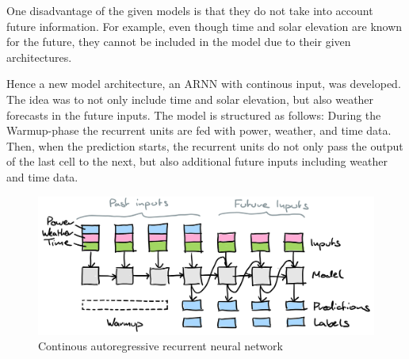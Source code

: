 \documentclass[11pt,table]{article}
\begin{document}
One disadvantage of the given models is that they do not take into account future information. For example, even though time and solar elevation are known for the future, they cannot be included in the model due to their given architectures.

Hence a new model architecture, an ARNN with continous input, was developed. The idea was to not only include time and solar elevation, but also weather forecasts in the future inputs. The model is structured as follows: During the Warmup-phase the recurrent units are fed with power, weather, and time data. Then, when the prediction starts, the recurrent units do not only pass the output of the last cell to the next, but also additional future inputs including weather and time data.
 
\begin{figure}[H]
	\centering
	\includegraphics[scale=1]{Figures/continousARNN.png}
	\caption{Continous autoregressive recurrent neural network}
	\label{fig:continousARNN}
\end{figure}
\end{document}
